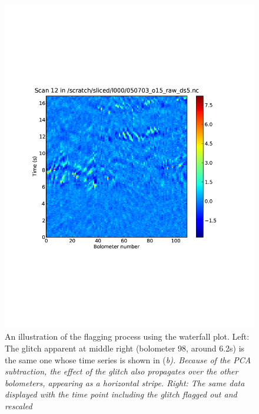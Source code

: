 \begin{figure}
\begin{minipage}{3.25in}
\begin{center}
      \includegraphics[scale=0.5]{flagger_glitchgone}
    \end{center}
  \end{minipage}
  \caption{An illustration of the flagging process using the waterfall plot.
  Left: The glitch apparent at middle right (bolometer 98, around 6.2s) is the
  same one whose time series is shown in (\em{b}).  Because of
  the PCA subtraction, the effect of the glitch also propagates over the other
  bolometers, appearing as a horizontal stripe. Right: The same data displayed
  with the time point including the glitch flagged out and rescaled}

  \label{fig:Flagger}

  \addtocounter{figure}{0} 
  \addtocounter{subfig}{1}
  

\end{figure}
